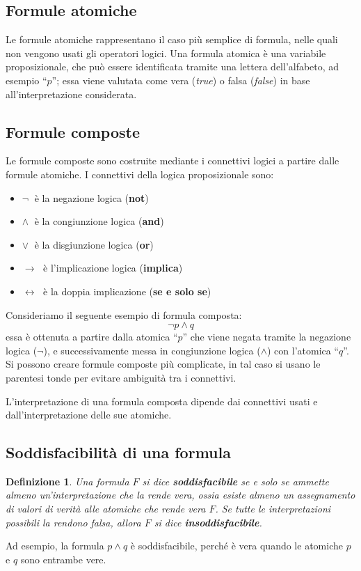 \documentclass[a4paper,12pt]{report}
\newcommand{\tto} {\leftrightarrow}
\newtheorem{definition}{Definizione}[section]
\begin{document}
\subsection{Formule atomiche}
Le formule atomiche rappresentano il caso più semplice di formula, nelle quali non vengono usati gli operatori logici. Una formula atomica è una variabile proposizionale, che può essere identificata tramite una lettera dell'alfabeto, ad esempio ``$p$''; essa viene valutata come vera (\emph{true}) o falsa (\emph{false}) in base all'interpretazione considerata. 

\subsection{Formule composte}
Le formule composte sono costruite mediante i connettivi logici a partire dalle formule atomiche. I connettivi della logica proposizionale sono:
\begin{itemize}
    \item $\lnot \;$ è la negazione logica (\textbf{not})
    \item $\land \;$ è la congiunzione logica (\textbf{and})
    \item $\lor \;$ è la disgiunzione logica (\textbf{or})
    \item $\to\;$ è l'implicazione logica (\textbf{implica})
    \item $\tto\;$ è la doppia implicazione (\textbf{se e solo se})
\end{itemize}
Consideriamo il seguente esempio di formula composta: 
\[ \lnot p \land q\] essa è ottenuta a partire dalla atomica ``$p$'' che viene negata tramite la negazione logica ($\lnot$), e successivamente messa in congiunzione logica ($\land$) con l'atomica ``$q$''. 
Si possono creare formule composte più complicate, in tal caso si usano le parentesi tonde per evitare ambiguità tra i connettivi.

L'interpretazione di una formula composta dipende dai connettivi usati e dall'interpretazione delle sue atomiche.

\subsection{Soddisfacibilità di una formula}
\begin{definition}
    Una formula $F$ si dice \textbf{soddisfacibile} se e solo se ammette almeno un'interpretazione che la rende vera, ossia esiste almeno un assegnamento di valori di verità alle atomiche che rende vera $F$. Se tutte le interpretazioni possibili la rendono falsa, allora $F$ si dice \textbf{insoddisfacibile}.
\end{definition}
Ad esempio, la formula $p \land q$ è soddisfacibile, perché è vera quando le atomiche $p$ e $q$ sono entrambe vere.
\end{document}
